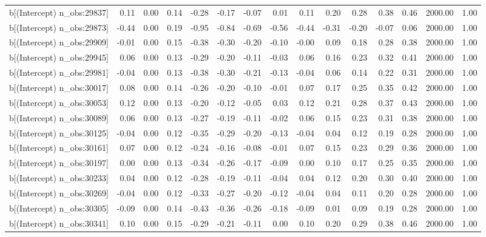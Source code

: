 \begin{table}[ht]
\begin{tabular}{rrrrrrrrrrrrrrr}
  b[(Intercept) n\_obs:29837] & 0.11 & 0.00 & 0.14 & -0.28 & -0.17 & -0.07 & 0.01 & 0.11 & 0.20 & 0.28 & 0.38 & 0.46 & 2000.00 & 1.00 \\ 
  b[(Intercept) n\_obs:29873] & -0.44 & 0.00 & 0.19 & -0.95 & -0.84 & -0.69 & -0.56 & -0.44 & -0.31 & -0.20 & -0.07 & 0.06 & 2000.00 & 1.00 \\ 
  b[(Intercept) n\_obs:29909] & -0.01 & 0.00 & 0.15 & -0.38 & -0.30 & -0.20 & -0.10 & -0.00 & 0.09 & 0.18 & 0.28 & 0.38 & 2000.00 & 1.00 \\ 
  b[(Intercept) n\_obs:29945] & 0.06 & 0.00 & 0.13 & -0.29 & -0.20 & -0.11 & -0.03 & 0.06 & 0.16 & 0.23 & 0.32 & 0.41 & 2000.00 & 1.00 \\ 
  b[(Intercept) n\_obs:29981] & -0.04 & 0.00 & 0.13 & -0.38 & -0.30 & -0.21 & -0.13 & -0.04 & 0.06 & 0.14 & 0.22 & 0.31 & 2000.00 & 1.00 \\ 
  b[(Intercept) n\_obs:30017] & 0.08 & 0.00 & 0.14 & -0.26 & -0.20 & -0.10 & -0.01 & 0.07 & 0.17 & 0.25 & 0.35 & 0.42 & 2000.00 & 1.00 \\ 
  b[(Intercept) n\_obs:30053] & 0.12 & 0.00 & 0.13 & -0.20 & -0.12 & -0.05 & 0.03 & 0.12 & 0.21 & 0.28 & 0.37 & 0.43 & 2000.00 & 1.00 \\ 
  b[(Intercept) n\_obs:30089] & 0.06 & 0.00 & 0.13 & -0.27 & -0.19 & -0.11 & -0.02 & 0.06 & 0.15 & 0.23 & 0.31 & 0.38 & 2000.00 & 1.00 \\ 
  b[(Intercept) n\_obs:30125] & -0.04 & 0.00 & 0.12 & -0.35 & -0.29 & -0.20 & -0.13 & -0.04 & 0.04 & 0.12 & 0.19 & 0.28 & 2000.00 & 1.00 \\ 
  b[(Intercept) n\_obs:30161] & 0.07 & 0.00 & 0.12 & -0.24 & -0.16 & -0.08 & -0.01 & 0.07 & 0.15 & 0.23 & 0.29 & 0.36 & 2000.00 & 1.00 \\ 
  b[(Intercept) n\_obs:30197] & 0.00 & 0.00 & 0.13 & -0.34 & -0.26 & -0.17 & -0.09 & 0.00 & 0.10 & 0.17 & 0.25 & 0.35 & 2000.00 & 1.00 \\ 
  b[(Intercept) n\_obs:30233] & 0.04 & 0.00 & 0.12 & -0.28 & -0.19 & -0.11 & -0.04 & 0.04 & 0.12 & 0.20 & 0.30 & 0.40 & 2000.00 & 1.00 \\ 
  b[(Intercept) n\_obs:30269] & -0.04 & 0.00 & 0.12 & -0.33 & -0.27 & -0.20 & -0.12 & -0.04 & 0.04 & 0.11 & 0.20 & 0.28 & 2000.00 & 1.00 \\ 
  b[(Intercept) n\_obs:30305] & -0.09 & 0.00 & 0.14 & -0.43 & -0.36 & -0.26 & -0.18 & -0.09 & 0.01 & 0.09 & 0.19 & 0.28 & 2000.00 & 1.00 \\ 
  b[(Intercept) n\_obs:30341] & 0.10 & 0.00 & 0.15 & -0.29 & -0.21 & -0.11 & 0.00 & 0.10 & 0.20 & 0.29 & 0.38 & 0.46 & 2000.00 & 1.00 \\ 

\end{tabular}
\end{table}
